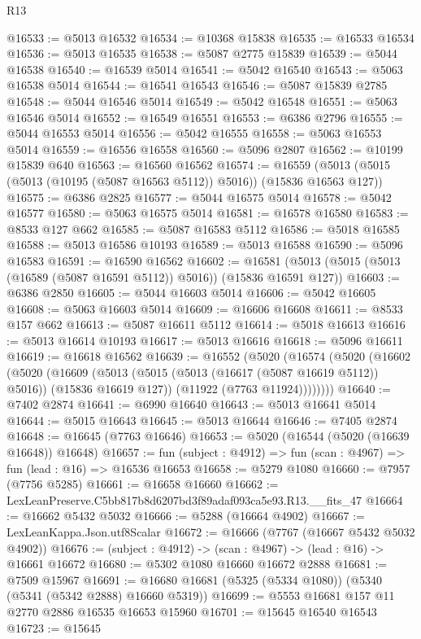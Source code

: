 \begin{lexlean}{R13}
\begin{coremodule}
@16533 := @5013 @16532
@16534 := @10368 @15838
@16535 := @16533 @16534
@16536 := @5013 @16535
@16538 := @5087 @2775 @15839
@16539 := @5044 @16538
@16540 := @16539 @5014
@16541 := @5042 @16540
@16543 := @5063 @16538 @5014
@16544 := @16541 @16543
@16546 := @5087 @15839 @2785
@16548 := @5044 @16546 @5014
@16549 := @5042 @16548
@16551 := @5063 @16546 @5014
@16552 := @16549 @16551
@16553 := @6386 @2796
@16555 := @5044 @16553 @5014
@16556 := @5042 @16555
@16558 := @5063 @16553 @5014
@16559 := @16556 @16558
@16560 := @5096 @2807
@16562 := @10199 @15839 @640
@16563 := @16560 @16562
@16574 := @16559 (@5013 (@5015 (@5013 (@10195 (@5087 @16563 @5112)) @5016)) (@15836 @16563 @127))
@16575 := @6386 @2825
@16577 := @5044 @16575 @5014
@16578 := @5042 @16577
@16580 := @5063 @16575 @5014
@16581 := @16578 @16580
@16583 := @8533 @127 @662
@16585 := @5087 @16583 @5112
@16586 := @5018 @16585
@16588 := @5013 @16586 @10193
@16589 := @5013 @16588
@16590 := @5096 @16583
@16591 := @16590 @16562
@16602 := @16581 (@5013 (@5015 (@5013 (@16589 (@5087 @16591 @5112)) @5016)) (@15836 @16591 @127))
@16603 := @6386 @2850
@16605 := @5044 @16603 @5014
@16606 := @5042 @16605
@16608 := @5063 @16603 @5014
@16609 := @16606 @16608
@16611 := @8533 @157 @662
@16613 := @5087 @16611 @5112
@16614 := @5018 @16613
@16616 := @5013 @16614 @10193
@16617 := @5013 @16616
@16618 := @5096 @16611
@16619 := @16618 @16562
@16639 := @16552
    (@5020
      (@16574
        (@5020
          (@16602
            (@5020
              (@16609
                (@5013 (@5015 (@5013 (@16617 (@5087 @16619 @5112)) @5016)) (@15836 @16619 @127))
                (@11922 (@7763 @11924))))))))
@16640 := @7402 @2874
@16641 := @6990 @16640
@16643 := @5013 @16641 @5014
@16644 := @5015 @16643
@16645 := @5013 @16644
@16646 := @7405 @2874
@16648 := @16645 (@7763 @16646)
@16653 := @5020 (@16544 (@5020 (@16639 @16648)) @16648)
@16657 := fun (subject : @4912) => fun (scan : @4967) => fun (lead : @16) => @16536 @16653
@16658 := @5279 @1080
@16660 := @7957 (@7756 @5285)
@16661 := @16658 @16660
@16662 := LexLeanPreserve.C5bb817b8d6207bd3f89adaf093ca5e93.R13.__fits_47
@16664 := @16662 @5432 @5032
@16666 := @5288 (@16664 @4902)
@16667 := LexLeanKappa.Json.utf8Scalar
@16672 := @16666 (@7767 (@16667 @5432 @5032 @4902))
@16676 := (subject : @4912) -> (scan : @4967) -> (lead : @16) -> @16661 @16672
@16680 := @5302 @1080 @16660 @16672 @2888
@16681 := @7509 @15967
@16691 := @16680 @16681 (@5325 (@5334 @1080)) (@5340 (@5341 (@5342 @2888) @16660 @5319))
@16699 := @5553 @16681 @157 @11 @2770 @2886 @16535 @16653 @15960
@16701 := @15645 @16540 @16543
@16723 := @15645

\end{coremodule}
\end{lexlean}

